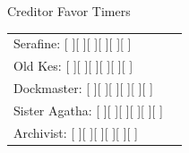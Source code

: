 \documentclass[10pt]{article}
\begin{document}
\begin{minipage}[t]{0.48\linewidth}
    \begin{charbox}{Creditor Favor Timers}
        \begin{tabular}{p{3cm} p{3cm}}
            Serafine: [ \hspace{0.3cm} ][ \hspace{0.3cm} ][ \hspace{0.3cm} ][ \hspace{0.3cm} ][ \hspace{0.3cm} ][ \hspace{0.3cm} ]\\
            Old Kes: [ \hspace{0.3cm} ][ \hspace{0.3cm} ][ \hspace{0.3cm} ][ \hspace{0.3cm} ][ \hspace{0.3cm} ][ \hspace{0.3cm} ]\\
            Dockmaster: [ \hspace{0.3cm} ][ \hspace{0.3cm} ][ \hspace{0.3cm} ][ \hspace{0.3cm} ][ \hspace{0.3cm} ][ \hspace{0.3cm} ]\\
            Sister Agatha: [ \hspace{0.3cm} ][ \hspace{0.3cm} ][ \hspace{0.3cm} ][ \hspace{0.3cm} ][ \hspace{0.3cm} ][ \hspace{0.3cm} ]\\
            Archivist: [ \hspace{0.3cm} ][ \hspace{0.3cm} ][ \hspace{0.3cm} ][ \hspace{0.3cm} ][ \hspace{0.3cm} ][ \hspace{0.3cm} ]\\
        \end{tabular}
    \end{charbox}
\end{minipage}
\hfill
\end{document}
